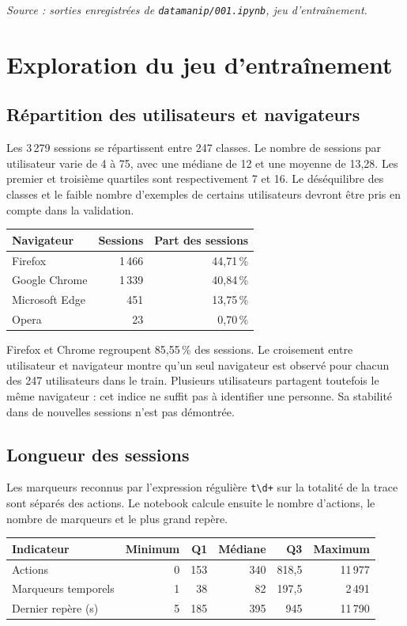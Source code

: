 \documentclass[10pt,a4paper]{article}
\newcommand{\sourceexploration}{\textit{Source : sorties enregistrées de \texttt{datamanip/001.ipynb}, jeu d'entraînement.}}
\begin{document}
\sourceexploration

\newpage
\section{Exploration du jeu d'entraînement}
\subsection{Répartition des utilisateurs et navigateurs}
Les 3\,279 sessions se répartissent entre 247 classes. Le nombre de sessions
par utilisateur varie de 4 à 75, avec une médiane de 12 et une moyenne
de 13,28. Les premier et troisième quartiles sont respectivement 7 et 16.
Le déséquilibre des classes et le faible nombre d'exemples de certains
utilisateurs devront être pris en compte dans la validation.

\begin{center}
\begin{tabular}{lrr}
\toprule
Navigateur & Sessions & Part des sessions \\
\midrule
Firefox & 1\,466 & 44,71\,\% \\
Google Chrome & 1\,339 & 40,84\,\% \\
Microsoft Edge & 451 & 13,75\,\% \\
Opera & 23 & 0,70\,\% \\
\bottomrule
\end{tabular}
\end{center}

Firefox et Chrome regroupent 85,55\,\% des sessions. Le croisement entre
utilisateur et navigateur montre qu'un seul navigateur est observé pour
chacun des 247 utilisateurs dans le train. Plusieurs utilisateurs partagent
toutefois le même navigateur : cet indice ne suffit pas à identifier une
personne. Sa stabilité dans de nouvelles sessions n'est pas démontrée.

\subsection{Longueur des sessions}
Les marqueurs reconnus par l'expression régulière \texttt{t\textbackslash d+}
sur la totalité de la trace sont séparés des actions. Le notebook calcule
ensuite le nombre d'actions, le nombre de marqueurs et le plus grand repère.

\begin{center}
\small
\begin{tabular}{lrrrrr}
\toprule
Indicateur & Minimum & Q1 & Médiane & Q3 & Maximum \\
\midrule
Actions & 0 & 153 & 340 & 818,5 & 11\,977 \\
Marqueurs temporels & 1 & 38 & 82 & 197,5 & 2\,491 \\
Dernier repère (s) & 5 & 185 & 395 & 945 & 11\,790 \\
\bottomrule
\end{tabular}
\end{center}
\end{document}

